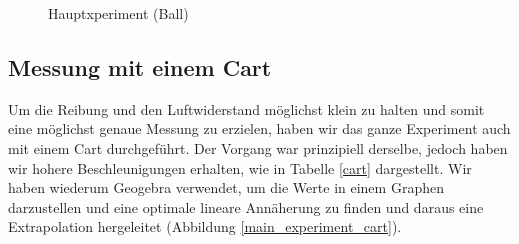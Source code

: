 \documentclass[a4paper, titlepage]{article}
\begin{document}
    \begin{figure}
        \centering
        \qquad
        \caption{Hauptxperiment (Ball)}
        \label{main_experiment_ball}
    \end{figure}

    
    \subsection{Messung mit einem Cart}
    Um die Reibung und den Luftwiderstand möglichst 
    klein zu halten und somit eine möglichst genaue
    Messung zu erzielen, haben wir das ganze Experiment
    auch mit einem Cart durchgeführt. Der Vorgang war
    prinzipiell derselbe, jedoch haben wir hohere
    Beschleunigungen erhalten, wie in Tabelle \ref{cart}
    dargestellt. Wir haben wiederum Geogebra verwendet,
    um die Werte in einem Graphen darzustellen und eine
    optimale lineare Annäherung zu finden
    und daraus eine Extrapolation hergeleitet 
    (Abbildung \ref{main_experiment_cart}).
\end{document}
